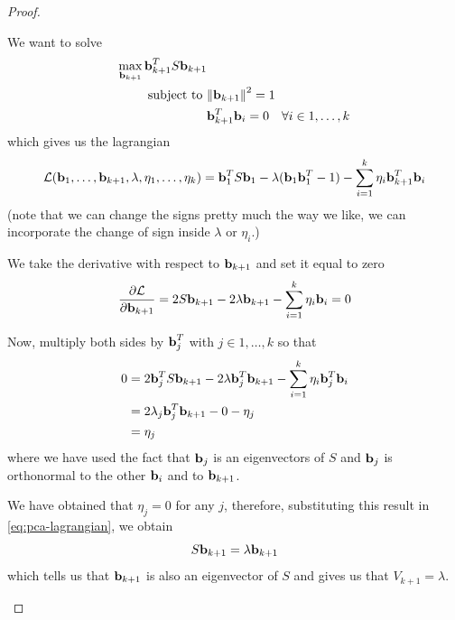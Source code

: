 \documentclass[12pt]{extarticle}
\renewcommand{\vec}[1]{\bvec{#1}}
\begin{document}
\begin{proof}
{\begin{description}
				      We want to solve
				      \begin{align}
					      \max_{\vec b_{k+1}}  \vec b_{k+1}^T S \vec b_{k+1} &                                                             \\
					      \text{subject to }                                 & \norm{\vec b_{k+1}}^2 = 1                                   \\
					                                                         & \vec b_{k+1}^T \vec b_i = 0 \quad \forall i \in 1, \dots, k
				      \end{align}
				      which gives us the lagrangian
				      \begin{equation}
					      \mathcal L(\vec b_1,\dots, \vec b_{k+1}, \lambda, \eta_1, \dots, \eta_k)
					      = \vec b_1^T S \vec b_1 - \lambda(\vec b_1 \vec b_1^T -1)
					      - \sum_{i = 1}^k \eta_i \vec b_{k+1}^T \vec b_i
				      \end{equation}
				      (note that we can change the signs pretty much the way we like,
				      we can incorporate the change of sign inside $\lambda$ or $\eta_i$.)

				      We take the derivative with respect to $\vec b_{k+1}$ and set it equal to zero
				      \begin{equation}
					      \pdv{\mathcal L}{\vec b_{k+1}} = 2 S \vec b_{k+1} - 2 \lambda \vec b_{k+1}
					      - \sum_{i = 1}^k \eta_i \vec b_i = 0
					      \label{eq:pca-lagrangian}
				      \end{equation}

				      Now, multiply both sides by $\vec b_j^T$ with $j \in 1, \dots, k$ so that
				      \begin{align}
					      0 & = 2 \vec b_j^T S \vec b_{k+1} - 2 \lambda \vec b_j^T \vec b_{k+1} - \sum_{i = 1}^k \eta_i \vec b_j^T \vec b_i \\
					        & = 2 \lambda_j \vec b_j^T \vec b_{k+1} - 0 - \eta_j                                                            \\
					        & = \eta_j                                                                                                      \\
				      \end{align}
				      where we have used the fact that $\vec b_j$ is an eigenvectors of $S$ and $\vec b_j$
				      is orthonormal to the other $\vec b_i$ and to $\vec b_{k+1}$.

				      We have obtained that $\eta_j = 0$ for any $j$, therefore, substituting this result
				      in \cref{eq:pca-lagrangian}, we obtain
				      \begin{equation}
					      S \vec b_{k+1} = \lambda \vec b_{k+1}
				      \end{equation}
				      which tells us that $\vec b_{k+1}$ is also an eigenvector of $S$ and gives us that
				      $V_{k+1} = \lambda$.
				      \qedhere
			\end{description}
		}
\end{proof}
\end{document}
